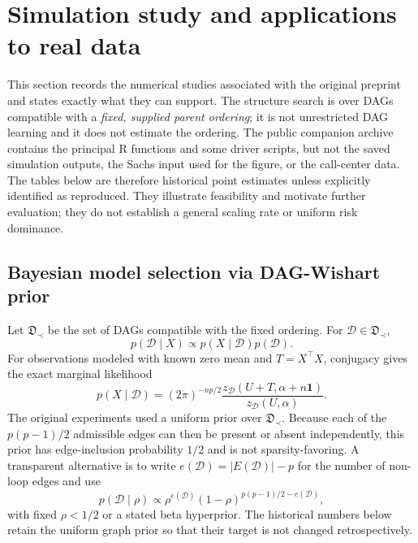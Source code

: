 \documentclass[12pt]{article}
\theoremstyle{plain}
\theoremstyle{definition}
\theoremstyle{remark}
\begin{document}
\section{Simulation study and applications to real data}\label{sec:empirical}
\label{simul}
This section records the numerical studies associated with the original
preprint and states exactly what they can support.  The structure search
is over DAGs compatible with a \emph{fixed, supplied parent ordering};
it is not unrestricted DAG learning and it does not estimate the
ordering.  The public companion archive contains the principal R
functions and some driver scripts, but not the saved simulation outputs,
the Sachs input used for the figure, or the call-center data.  The
tables below are therefore historical point estimates unless explicitly
identified as reproduced.  They illustrate feasibility and motivate
further evaluation; they do not establish a general scaling rate or
uniform risk dominance.



\subsection{Bayesian model selection via DAG-Wishart prior}
Let \(\mathfrak{D}_{\prec}\) be the set of DAGs compatible with the fixed
ordering.  For \(\mathcal{D}\in\mathfrak{D}_{\prec}\),
\[
p(\mathcal{D}\mid X)\propto
p(X\mid\mathcal{D})p(\mathcal{D}).
\]
For observations modeled with known zero mean and
\(T=X^\top X\), conjugacy gives the exact marginal likelihood
\begin{equation}\label{eq:marginal-score}
p(X\mid\mathcal{D})
=(2\pi)^{-np/2}
\frac{z_{\mathcal{D}}(U+T,\alpha+n\mathbf{1})}
     {z_{\mathcal{D}}(U,\alpha)}.
\end{equation}
The original experiments used a uniform prior over
\(\mathfrak{D}_{\prec}\).  Because each of the \(p(p-1)/2\) admissible
edges can then be present or absent independently, this prior has
edge-inclusion probability \(1/2\) and is not sparsity-favoring.  A
transparent alternative is to write
\(e(\mathcal D)=|E(\mathcal D)|-p\) for the number of non-loop edges
and use
\[
p(\mathcal{D}\mid\rho)\propto
\rho^{e(\mathcal{D})}(1-\rho)^{p(p-1)/2-e(\mathcal{D})},
\]
with fixed \(\rho<1/2\) or a stated beta hyperprior.  The historical
numbers below retain the uniform graph prior so that their target is not
changed retrospectively.
\end{document}
